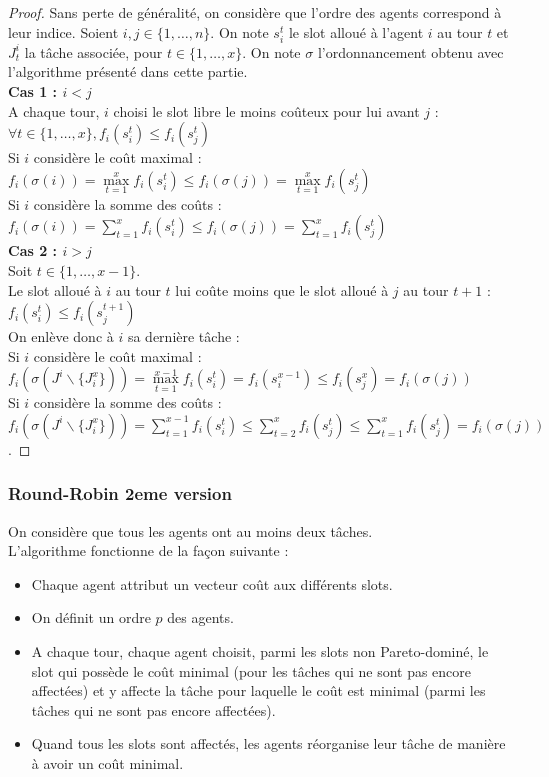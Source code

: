 \documentclass[12pt]{article}
\theoremstyle{definition}
\begin{document}
\begin{proof}
Sans perte de généralité, on considère que l'ordre des agents correspond à leur indice. Soient $i, j \in \{1, \dots, n\}$. On note $s_i^t$ le slot alloué à l'agent $i$ au tour $t$ et $J^i_t$ la tâche associée, pour $t\in\{1,\dots,x\}$. On note $\sigma$ l'ordonnancement obtenu avec l'algorithme présenté dans cette partie.\\
\textbf{Cas 1 : $i<j$}\\
A chaque tour, $i$ choisi le slot libre le moins coûteux pour lui avant $j$ :\\
 $\forall t\in \{1, \dots, x\}, f_{i}(s^t_{i})\leq f_{i}(s^t_{j})$\\
 Si $i$ considère le coût maximal : $f_{i}(\sigma(i)) = \max\limits_{t = 1}^x f_{i}(s^t_{i}) \leq f_{i}(\sigma(j)) = \max\limits_{t = 1}^x f_{i}(s^t_{j})$\\
 Si $i$ considère la somme des coûts : $f_{i}(\sigma(i)) = \sum\limits_{t = 1}^x f_{i}(s^t_{i})\leq f_{i}(\sigma(j)) = \sum\limits_{t = 1}^x f_{i}(s^t_{j})$\\
\textbf{Cas 2 : $i>j$}\\
Soit $t\in\{1,\dots,x-1\}$.\\
Le slot alloué à $i$ au tour $t$ lui coûte moins que le slot alloué à $j$ au tour $t+1$ : \\
$f_{i}(s^t_{i})\leq f_{i}(s^{t+1}_{j})$\\
On enlève donc à $i$ sa dernière tâche :\\
Si $i$ considère le coût maximal : \\
$f_{i}(\sigma(J^{i}\backslash\{J_{i}^x\})) = \max\limits_{t = 1}^{x-1} f_{i}(s^t_{i}) = f_{i}(s^{x-1}_{i}) \leq f_{i}(s^x_{j}) = f_{i}(\sigma(j))$\\
Si $i$ considère la somme des coûts : \\
$f_{i}(\sigma(J^{i}\backslash\{J_{i}^x\})) = \sum\limits_{t = 1}^{x-1} f_{i}(s^t_{i}) \leq \sum\limits_{t = 2}^{x} f_{i}(s^t_{j}) \leq \sum\limits_{t = 1}^{x} f_{i}(s^t_{j}) = f_{i}(\sigma(j))$.
\end{proof}

\subsubsection{Round-Robin 2eme version}
\noindent
On considère que tous les agents ont au moins deux tâches.\\
L'algorithme fonctionne de la façon suivante :
\begin{itemize}
	\item Chaque agent attribut un vecteur coût aux différents slots.
	\item On définit un ordre $p$ des agents.
	\item A chaque tour, chaque agent choisit, parmi les slots non Pareto-dominé, le slot qui possède le coût minimal (pour les tâches qui ne sont pas encore affectées) et y affecte la tâche pour laquelle le coût est minimal (parmi les tâches qui ne sont pas encore affectées).
	\item Quand tous les slots sont affectés, les agents réorganise leur tâche de manière à avoir un coût minimal.
\end{itemize}
\end{document}
